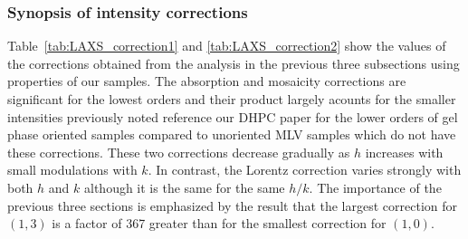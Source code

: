 \subsubsection{Synopsis of intensity corrections}
Table~\ref{tab:LAXS_correction1} and \ref{tab:LAXS_correction2} show
the values of the corrections obtained from the analysis in the previous three 
subsections using properties of our samples. The absorption and mosaicity 
corrections are significant for the lowest orders and their product largely 
acounts for the smaller intensities previously noted 
{\jn reference our DHPC paper} for the lower orders of gel phase oriented 
samples compared to unoriented MLV samples which do not have these corrections.  
These two corrections decrease gradually as $h$ increases with small 
modulations with $k$. In contrast, the Lorentz correction varies strongly with 
both $h$ and $k$ although it is the same for the same $h/k$. The importance of 
the previous three sections is emphasized by the result that the largest 
correction for $(1,3)$ is a factor of 367 greater than for the smallest 
correction for $(1,0)$.

